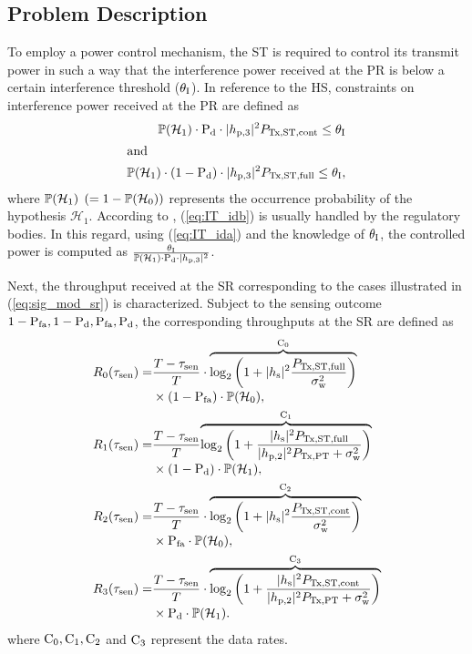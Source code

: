 \subsection{Problem Description}
To employ a power control mechanism, the ST is required to control its transmit power in such a way that the interference power received at the PR is below a certain interference threshold ($\theta_{\text{I}}$). In reference to the HS, constraints on interference power received at the PR are defined as
\begin{align}
\mathbb P(\mathcal{H}_1) \cdot \text{P}_{\text{d}} \cdot |h_{\text{p,3}}|^2 P_{\text{Tx,ST,cont}} \le \theta_{\text{I}} \label{eq:IT_ida} \\
\intertext{and   } 
\mathbb P(\mathcal{H}_1) \cdot (1 - \text{P}_{\text{d}}) \cdot |h_{\text{p,3}}|^2 P_{\text{Tx,ST,full}} \le \theta_{\text{I}} \label{eq:IT_idb},
\end{align}
where $\mathbb P(\mathcal{H}_1)$ $(= 1 - \mathbb P(\mathcal{H}_0))$ represents the occurrence probability of the hypothesis $\mathcal H_1$. 
According to \cite{Sharma14}, (\ref{eq:IT_idb}) is usually handled by the regulatory bodies. In this regard, using (\ref{eq:IT_ida}) and the knowledge of $\theta_{\text{I}}$, the controlled power is computed as $\frac{\theta_{\text{I}}}{\mathbb P(\mathcal{H}_1) \cdot \text{P}_{\text{d}} \cdot |h_{\text{p,3}}|^2}$.

Next, the throughput received at the SR corresponding to the cases illustrated in (\ref{eq:sig_mod_sr}) is characterized. Subject to the sensing outcome $1 - \text{P}_{\text{fa}}, 1 - \text{P}_{\text{d}}, \text{P}_{\text{fa}}, \text{P}_{\text{d}}$, the corresponding throughputs at the SR are defined as 
\begin{align}
R_{\text{0}}(\tau_{\text{sen}}) =& \frac{T- \tau_{\text{sen}}}{T} \cdot \smash[b]{\overbrace{\log_2 \left(1 + |h_{\text{s}}|^2 \frac{P_{\text{Tx,ST,full}}}{\sigma^2_{\text{w}}}\right)}^{\text{C}_{\text{0}}}} \nonumber \\ 
\quad & \times (1 - \text{P}_{\text{fa}} ) \cdot \mathbb P(\mathcal{H}_0),  \label{eq:Cap0} \\ 
R_{\text{1}}(\tau_{\text{sen}}) =& \frac{T- \tau_{\text{sen}}}{T} \smash[b]{\overbrace{\log_2 \left(1 + \frac{|h_{\text{s}}|^2 P_{\text{Tx,ST,full}} }{|h_{\text{p,2}}|^2 P_{\text{Tx,PT}}  + \sigma^2_{\text{w}}} \right)}^{\text{C}_{\text{1}}}} \nonumber \\ 
\quad & \times (1 - \text{P}_{\text{d}}) \cdot \mathbb P(\mathcal{H}_1),  \label{eq:Cap1} \\ 
R_{\text{2}}(\tau_{\text{sen}}) =& \frac{T- \tau_{\text{sen}}}{T} \cdot \smash[b]{\overbrace{\log_2 \left(1 + |h_{\text{s}}|^2 \frac{P_{\text{Tx,ST,cont}}}{\sigma^2_{\text{w}}}\right)}^{\text{C}_{\text{2}}}} \nonumber \\ 
\quad & \times \text{P}_{\text{fa}} \cdot \mathbb P(\mathcal{H}_0),  \label{eq:Cap2} \\ 
R_{\text{3}}(\tau_{\text{sen}}) =& \frac{T- \tau_{\text{sen}}}{T} \cdot \smash[b]{\overbrace{\log_2 \left(1 + \frac{|h_{\text{s}}|^2 P_{\text{Tx,ST,cont}} }{|h_{\text{p,2}}|^2 P_{\text{Tx,PT}}  + \sigma^2_{\text{w}}} \right)}^{\text{C}_{\text{3}}}}  \nonumber \\   
\quad & \times \text{P}_{\text{d}} \cdot \mathbb P(\mathcal{H}_1).  \label{eq:Cap3}  
\end{align}
where $\text{C}_{\text{0}}, \text{C}_{\text{1}}, \text{C}_{\text{2}}$ and $\text{C}_{\text{3}}$ represent the data rates.

